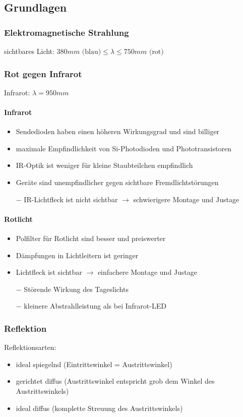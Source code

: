 \documentclass{scrreprt}
\begin{document}
\subsection{Grundlagen }
\subsubsection{Elektromagnetische Strahlung}
sichtbares Licht:
$380\unit{mm}\text{ (blau)} \leq \lambda \leq 750 \unit{mm} \text{ (rot)}$

\subsubsection*{Rot gegen Infrarot}
Infrarot: $\lambda = 950 \unit{mm}$
\paragraph{Infrarot}
\begin{itemize}[label=$+$]
\item Sendedioden haben einen höheren Wirkungsgrad und sind billiger
\item maximale Empfindlichkeit von Si-Photodioden und Phototransistoren
\item IR-Optik ist weniger für kleine Staubteilchen empfindlich
\item Geräte sind unempfindlicher gegen sichtbare Fremdlichtstörungen
\item[$-$] IR-Lichtfleck ist nicht sichtbar $\to$ schwierigere Montage und Justage
\end{itemize}
\paragraph{Rotlicht}
\begin{itemize}[label=$+$]
\item Polfilter für Rotlicht sind besser und preiswerter
\item Dämpfungen in Lichtleitern ist geringer
\item Lichtfleck ist sichtbar $\to$ einfachere Montage und Justage
\item[$-$] Störende Wirkung des Tageslichts
\item[$-$] kleinere Abstrahlleistung als bei Infrarot-LED
\end{itemize}

\subsubsection{Reflektion}
Reflektionsarten:
\begin{itemize}
\item ideal spiegelnd (Eintrittswinkel = Austrittswinkel)
\item gerichtet diffus (Austrittswinkel entspricht grob dem Winkel des Austrittswinkels)
\item ideal diffus (komplette Streuung des Austrittswinkels)
\end{itemize}
\end{document}
